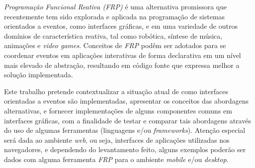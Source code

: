 
%

\emph{Programação Funcional Reativa (FRP)} é uma
alternativa promissora que recentemente tem sido
explorada e aplicada na programação de sistemas
orientados a eventos, como interfaces gráficas,
e em uma variedade de outros domínios
de característica reativa, tal como robótica,
síntese de música, animações e \emph{video games}.
Conceitos de \emph{FRP} podêm ser adotados para
se coordenar eventos em aplicações interativas de forma declarativa
em um nível mais elevado de abstração, resultando em
código fonte que expressa melhor a solução implementada.





Este trabalho pretende contextualizar a situação atual
de como interfaces orientadas a eventos são implementadas,
apresentar os conceitos das abordagens alternativas, e
fornecer implementações de alguns componentes comuns em
interfaces gráficas, com a finalidade de testar e comparar
tais abordagens através do uso de algumas ferramentas
(linguagens e/ou \emph{frameworks}). Atenção especial será
dada ao ambiente \emph{web}, ou seja, interfaces de
aplicações utilizadas nos navegadores, e dependendo do
levantamento feito, alguns exemplos poderão ser dados
com alguma ferramenta \emph{FRP} para o ambiente
\emph{mobile} e/ou \emph{desktop}.

